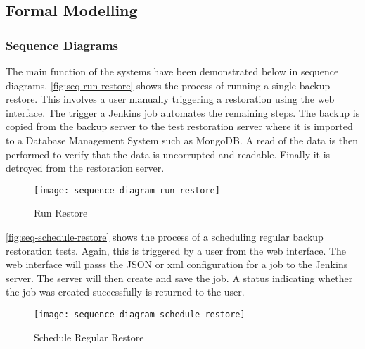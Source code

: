 	\subsection{Formal Modelling}
	\subsubsection{Sequence Diagrams}
	
		The main function of the systems have been demonstrated below in sequence diagrams. \autoref{fig:seq-run-restore} shows the process of running a single backup restore. This involves a user manually triggering a restoration using the web interface. The trigger a Jenkins job automates the remaining steps. The backup is copied from the backup server to the test restoration server where it is imported to a Database Management System such as MongoDB. A read of the data is then performed to verify that the data is uncorrupted and readable. Finally it is detroyed from the restoration server.
		\begin{figure}[H]
			\setlength{\belowcaptionskip}{15pt plus 3pt minus 2pt}
			\caption{Run Restore}
			\centering
			\texttt{[image: sequence-diagram-run-restore]}
			\label{fig:seq-run-restore}
		\end{figure}

		\noindent \autoref{fig:seq-schedule-restore} shows the process of a scheduling regular backup restoration tests. Again, this is triggered by a user from the web interface. The web interface will passs the JSON or xml configuration for a job to the Jenkins server. The server will then create and save the job. A status indicating whether the job was created successfully is returned to the user. 
		\begin{figure}[H]
			\setlength{\belowcaptionskip}{15pt plus 3pt minus 2pt}
			\caption{Schedule Regular Restore}
			\centering
			\texttt{[image: sequence-diagram-schedule-restore]}
			\label{fig:seq-schedule-restore}
		\end{figure}
		
